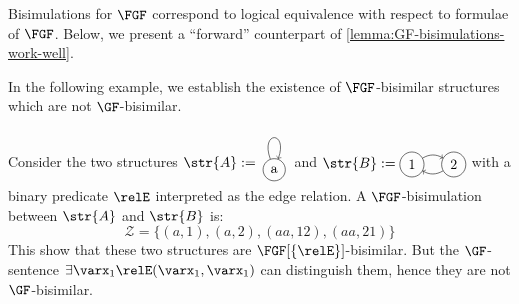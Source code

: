 Bisimulations for $\FGF$ correspond to logical equivalence with respect to formulae of $\FGF$.
Below, we present a ``forward'' counterpart of \cref{lemma:GF-bisimulations-work-well}.


\noindent
In the following example, we establish the existence of $\FGF$-bisimilar structures which are not $\GF$-bisimilar.
\begin{example}
  Consider the two structures
  $\str{A} := \tikz[baseline=0.5ex]{\path (0pt,-2.5ex) -- (0pt,-2.5ex); \path[->] (0,0) node[draw,circle] (n1) {a} (n1) edge[loop above,in=70,out=110,looseness=10] (n1);}$ and
  $\str{B} := \tikz[baseline=-0.5ex]{\path[->] (0,0) node (n1) [draw,circle] {1} (3em,0) node (n2) [draw,circle] {2} (n1) edge[bend left] (n2) (n2) edge[bend left] (n1);}$
  with a binary predicate $\relE$ interpreted as the edge relation.
  A $\FGF$-bisimulation between $\str{A}$ and $\str{B}$ is:
  \begin{equation*}
  \mathcal{Z} = \{ (a,1), (a,2), (aa,12), (aa, 21) \}
  \end{equation*}
  This show that these two structures are $\FGF[\{\relE\}]$-bisimilar.
  But the $\GF$-sentence $\exists{\varx_1}\relE(\varx_1,\varx_1)$ can distinguish them, hence they are not $\GF$-bisimilar.
\end{example}

